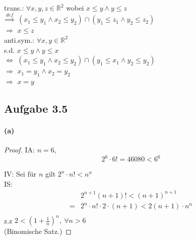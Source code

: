 trans.: $\forall x,y,z\in\mathbb{R}^2$ wobei $x\leq y\wedge y\leq z$\\
$\overset{def}{\Rightarrow}$ $(x_1\leq y_1\wedge x_2\leq y_2)\cap(y_1\leq z_1\wedge y_2\leq z_2)$\\
$\Rightarrow$ $x\leq z$\\

anti.sym.: $\forall x,y\in\mathbb{R}^2$\\
s.d. $x\leq y\wedge y\leq x$\\
$\Leftrightarrow$ $(x_1\leq y_1\wedge x_2\leq y_2)\cap(y_1\leq x_1\wedge y_2\leq y_2)$\\
$\Rightarrow$ $x_1=y_1\wedge x_2=y_2$\\
$\Rightarrow$ $x=y$

\newpage

\subsection{Aufgabe 3.5}

\paragraph{(a)}
\begin{proof}
IA: $n=6$,
\begin{equation*}
2^6\cdot 6!=46080<6^6
\end{equation*}

IV: Sei für $n$ gilt $2^n\cdot n!<n^n$\\

IS: 
\begin{align*}
&2^{n+1}(n+1)!<(n+1)^{n+1}\\
=&2^n\cdot n!\cdot 2\cdot(n+1)
<2(n+1)\cdot n^n\\
\end{align*}
z.z $2<(1+\frac{1}{n})^n,\ \forall n>6$\\
(Binomische Satz.)
\end{proof}

